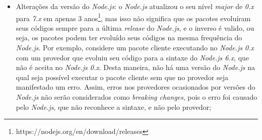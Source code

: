 \begin{itemize}
    \item Alterações da versão do \textit{Node.js}: o \textit{Node.js} atualizou o seu nível \textit{major} de \textit{0.x} para \textit{7.x} em apenas 3 anos\footnote{https://nodejs.org/en/download/releases}, mas isso não significa que os pacotes evoluíram seus códigos sempre para a última \textit{release} do \textit{Node.js}, e o inverso é valido, ou seja, os pacotes podem ter evoluído seus códigos na mesma frequência do \textit{Node.js}. Por exemplo, considere um pacote cliente executando no \textit{Node.js 0.x} com um provedor que evoluiu seu código para a sintaxe do \textit{Node.js 6.x}, que não é aceita no \textit{Node.js 0.x}. Desta maneira, não há uma versão do \textit{Node.js}  na qual seja possível executar o pacote cliente sem que no provedor seja manifestado um erro. Assim, erros nos provedores ocasionados por versões do \textit{Node.js} não serão considerados como \textit{breaking changes}, pois o erro foi causado pelo \textit{Node.js}, que não reconhece a sintaxe, e não pelo provedor;


\end{itemize}
